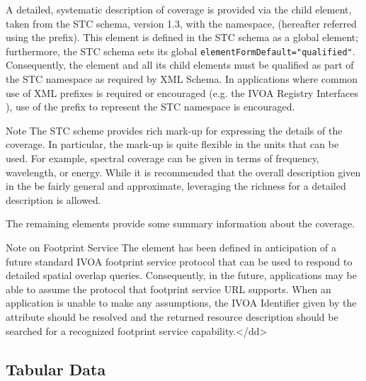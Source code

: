 \documentclass[11pt,a4paper]{ivoa}
\begin{document}

A detailed, systematic description of coverage is provided via the
child  element, taken from
the STC schema, version 1.3, with the namespace,
 (hereafter
referred using the  prefix).  This element is defined
in the STC schema as a global element; furthermore, the STC schema
sets its global \verb|elementFormDefault="qualified"|.
Consequently, the  element
and all its child elements must be qualified as part of the STC
namespace as required by XML Schema.
In applications where common use of XML prefixes is required or
encouraged (e.g. the IVOA Registry Interfaces \citep{todo:RI1.1}),
use of the  prefix to represent the STC namespace is
encouraged.   


\begin{admonition}{Note}
The STC scheme provides rich mark-up for expressing the
       details of the coverage.  In particular, the mark-up is quite
       flexible in the units that can be used.  For example, spectral
       coverage can be given in terms of frequency, wavelength, or
       energy.  While it is recommended that the overall description
       given in the  be
       fairly general and approximate, leveraging the richness for a
       detailed description is allowed.
\end{admonition}



The remaining elements provide some summary information about the
coverage. 



\begin{admonition}{Note on Footprint Service}
The  element has been defined in
       anticipation of a future standard IVOA footprint service
       protocol that can be used to respond to detailed spatial
       overlap queries.  Consequently, in the future, applications may
       be able to assume the protocol that footprint service URL
       supports.  When an application is unable to make any
       assumptions, the IVOA Identifier given by the attribute should
       be resolved and the returned resource description should be
       searched for a recognized footprint service capability.</dd> 
\end{admonition}

\subsection{Tabular Data}
\label{sect:table}
\end{document}
